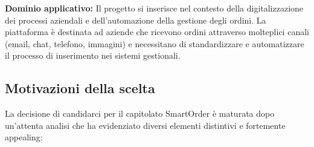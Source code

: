 \documentclass{article}
\begin{document}
    \vspace{1em}
    
	\textbf{Dominio applicativo:}
	Il progetto si inserisce nel contesto della digitalizzazione dei processi aziendali e dell'automazione della gestione degli ordini. La piattaforma è destinata ad aziende che ricevono ordini attraverso molteplici canali (email, chat, telefono, immagini) e necessitano di standardizzare e automatizzare il processo di inserimento nei sistemi gestionali.
	
	\subsection{Motivazioni della scelta}
	La decisione di candidarci per il capitolato SmartOrder è maturata dopo un'attenta analisi che ha evidenziato diversi elementi distintivi e fortemente appealing:
	
\end{document}
